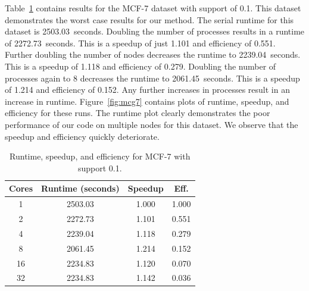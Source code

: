 Table~\ref{tab:mcg7} contains results for the MCF-7 dataset with
support of 0.1. This dataset demonstrates the worst case results for our
method. The serial runtime for this dataset is 2503.03~seconds.
Doubling the number of processes results in a runtime of 2272.73~seconds. This
is a speedup of just 1.101 and efficiency of 0.551. Further doubling the number
of nodes decreases the runtime to 2239.04~seconds. This is a speedup of 1.118
and efficiency of 0.279. Doubling the number of processes again to 8 decreases
the runtime to 2061.45~seconds. This is a speedup of 1.214 and efficiency of
0.152. Any further increases in processes result in an increase in runtime.
Figure~\ref{fig:mcg7} contains plots of runtime, speedup, and efficiency
for these runs. The runtime plot clearly demonstrates the poor performance of
our code on multiple nodes for this dataset. We observe that the speedup and
efficiency quickly deteriorate.


\begin{table}[H]
\centering
\begin{tabular}{cccc}
\hline
Cores & Runtime (seconds) & Speedup &  Eff.  \\
\hline
 1    & 2503.03 & 1.000  & 1.000 \\
 2    & 2272.73 & 1.101  & 0.551 \\
 4    & 2239.04 & 1.118  & 0.279 \\
 8    & 2061.45 & 1.214  & 0.152 \\
16    & 2234.83 & 1.120  & 0.070 \\
32    & 2234.83 & 1.142  & 0.036 \\
\hline
\end{tabular}
\caption{Runtime, speedup, and efficiency for MCF-7 with support
         0.1.}
\label{tab:mcg7}
\end{table}

